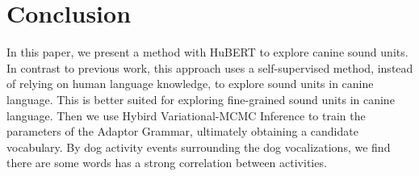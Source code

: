 \section{Conclusion}
In this paper, we present a method with HuBERT to explore canine sound units. In contrast to previous work, this approach uses a self-supervised method, instead of relying on human language knowledge, to explore sound units in canine language. This is better suited for exploring fine-grained sound units in canine language. Then we use Hybird Variational-MCMC Inference to train the parameters of the Adaptor Grammar, ultimately obtaining a candidate vocabulary. By dog activity events surrounding the dog vocalizations, we find there are some words has a strong correlation between activities. 

